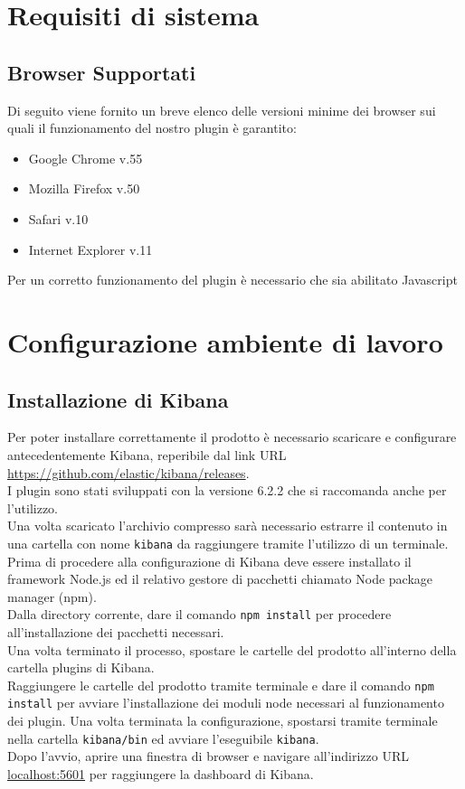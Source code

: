 \section{Requisiti di sistema}
\subsection{Browser Supportati}

Di seguito viene fornito un breve elenco delle versioni minime dei browser sui quali il funzionamento del nostro plugin è garantito:
\begin{itemize}
	
	\item Google Chrome v.55
	\item Mozilla Firefox v.50
	\item Safari v.10
	\item Internet Explorer v.11
	
\end{itemize}

Per un corretto funzionamento del plugin è necessario che sia abilitato Javascript




\section{Configurazione ambiente di lavoro}
\label{sec:configurazione}
\subsection{Installazione di Kibana}
Per poter installare correttamente il prodotto è necessario scaricare e configurare antecedentemente Kibana, reperibile dal link URL \url{https://github.com/elastic/kibana/releases}.\\
I plugin sono stati sviluppati con la versione 6.2.2 che si raccomanda anche per l'utilizzo.\\
Una volta scaricato l'archivio compresso sarà necessario estrarre il contenuto in una cartella con nome \texttt{kibana} da raggiungere tramite l'utilizzo di un terminale.
Prima di procedere alla configurazione di Kibana deve essere installato il framework Node.js ed il relativo gestore di pacchetti chiamato Node package manager (npm).\\
Dalla directory corrente, dare il comando \texttt{npm install} per procedere all'installazione dei pacchetti necessari.\\
Una volta terminato il processo, spostare le cartelle del prodotto all'interno della cartella plugins di Kibana.\\
Raggiungere le cartelle del prodotto tramite terminale e dare il comando \texttt{npm install} per avviare l'installazione dei moduli node necessari al funzionamento dei plugin.
Una volta terminata la configurazione, spostarsi tramite terminale nella cartella \texttt{kibana/bin} ed avviare l'eseguibile \texttt{kibana}.\\
Dopo l'avvio, aprire una finestra di browser e navigare all'indirizzo URL \url{localhost:5601} per raggiungere la dashboard di Kibana.
